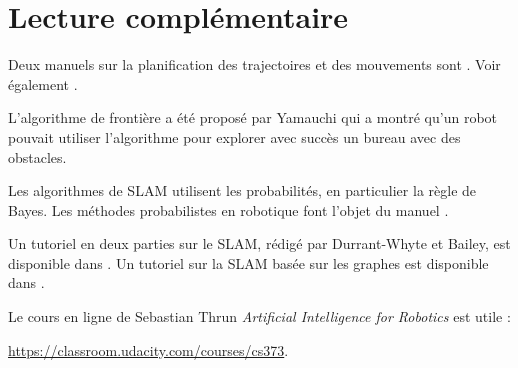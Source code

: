 \section{Lecture complémentaire}

Deux manuels sur la planification des trajectoires et des mouvements sont \cite{latombe,lavalle}. Voir également \cite[Chapitre 6]{siegwart}.

L'algorithme de frontière a été proposé par Yamauchi \cite{yamauchi} qui a montré qu'un robot pouvait utiliser l'algorithme pour explorer avec succès un bureau avec des obstacles.

Les algorithmes de SLAM utilisent les probabilités, en particulier la règle de Bayes. Les méthodes probabilistes en robotique font l'objet du manuel \cite{thrun}.

Un tutoriel en deux parties sur le SLAM, rédigé par Durrant-Whyte et Bailey, est disponible dans \cite{slam-tutorial1,slam-tutorial2}. Un tutoriel sur la SLAM basée sur les graphes est disponible dans \cite{slam-graph}.

Le cours en ligne de Sebastian Thrun \emph{Artificial Intelligence for Robotics} est utile : \par\url{https://classroom.udacity.com/courses/cs373}.

